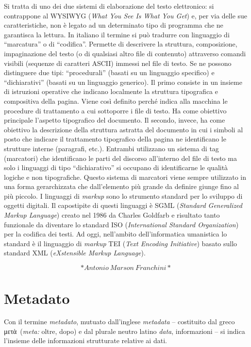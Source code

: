 \documentclass[
  b5paper,
  twoside,
  12pt,
  chapterprefix=false,
  bibliography=totocnumbered,
  parskip=false]{scrbook}
\begin{document}
Si tratta di uno dei due sistemi di elaborazione del testo elettronico:
si contrappone al WYSIWYG (\emph{What You See Is What You Get}) e, per via
delle sue caratteristiche, non è legato ad un determinato tipo di
programma che ne garantisca la lettura. In italiano il termine si può
tradurre con linguaggio di \enquote{marcatura} o di \enquote{codifica}. Permette di
descrivere la struttura, composizione, impaginazione del testo (o di
qualsiasi altro file di contenuto) attraverso comandi visibili (sequenze
di caratteri ASCII) immessi nel file di testo.
Se ne possono distinguere due tipi: \enquote{procedurali} (basati su un
linguaggio specifico) e \enquote{dichiarativi} (basati su un linguaggio
generico). Il primo consiste in un insieme di istruzioni operative che
indicano localmente la struttura tipografica e compositiva della pagina.
Viene così definito perché indica alla macchina le procedure di
trattamento a cui sottoporre i file di testo. Ha come obiettivo
principale l'aspetto tipografico del documento. Il secondo, invece, ha
come obiettivo la descrizione della struttura astratta del documento in
cui i simboli al posto che indicare il trattamento tipografico della
pagina ne identificano le strutture interne (paragrafi, etc.). Entrambi
utilizzano un sistema di tag (marcatori) che identificano le parti del
discorso all'interno del file di testo ma solo i linguaggi di tipo
\enquote{dichiarativo} si occupano di identificarne le qualità logiche e non
tipografiche. Questo sistema di marcatori viene sempre utilizzato in una
forma gerarchizzata che dall'elemento più grande da definire giunge fino
al più piccolo.
I linguaggi di \emph{markup} sono lo strumento standard per lo sviluppo di
oggetti digitali. Il capostipite di questi linguaggi è SGML (\emph{Standard
Generalized Markup Language}) creato nel 1986 da Charles Goldfarb e
risultato tanto funzionale da diventare lo standard ISO (\emph{International
Standard Organization}) per la codifica dei testi. Ad oggi, nell'ambito
dell'informatica umanistica lo standard è il linguaggio di \emph{markup} TEI
(\emph{Text Encoding Initiative}) basato sullo standard XML (\emph{eXstensible
Markup Language}).

\[*Antonio~Marson~Franchini*\]

\hypertarget{metadato}{%
\chapter{Metadato}\label{metadato}}

Con il termine \emph{metadato}, mutuato dall'inglese \emph{metadata} -- costituito
dal greco μετὰ~(\emph{meta:} oltre, dopo) e dal plurale neutro latino \emph{data},
informazioni -- si indica l'insieme delle informazioni strutturate
relative ai dati.
\end{document}
